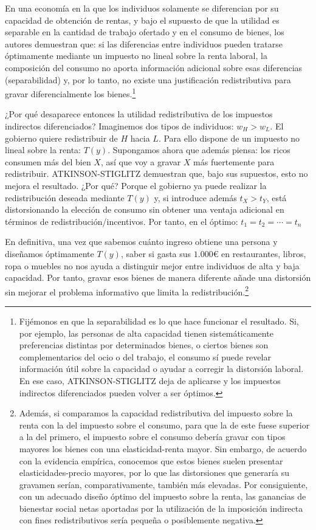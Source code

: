 \documentclass[10pt,a4paper]{article}
\begin{document}
En una economía en la que los individuos solamente se diferencian por su capacidad de obtención de rentas, y bajo el supuesto de que la utilidad es separable en la cantidad de trabajo ofertado y en el consumo de bienes, los autores demuestran que: si las diferencias entre individuos pueden tratarse óptimamente mediante un impuesto no lineal sobre la renta laboral, la composición del consumo no aporta información adicional sobre esas diferencias (separabilidad) y, por lo tanto, no existe una justificación redistributiva para gravar diferencialmente los bienes.\footnote{%
    Fijémonos en que la separabilidad es lo que hace funcionar el resultado. Si, por ejemplo, las personas de alta capacidad tienen sistemáticamente preferencias distintas por determinados bienes, o ciertos bienes son complementarios del ocio o del trabajo, el consumo sí puede revelar información útil sobre la capacidad o ayudar a corregir la distorsión laboral. En ese caso, ATKINSON-STIGLITZ deja de aplicarse y los impuestos indirectos diferenciados pueden volver a ser óptimos.
}

¿Por qué desaparece entonces la utilidad redistributiva de los impuestos indirectos diferenciados? Imaginemos dos tipos de individuos: $w_H>w_L$. El gobierno quiere redistribuir de $H$ hacia $L$. Para ello dispone de un impuesto no lineal sobre la renta: $T(y)$. Supongamos ahora que además piensa: los ricos consumen más del bien $X$, así que voy a gravar $X$ más fuertemente para redistribuir. ATKINSON-STIGLITZ demuestran que, bajo sus supuestos, esto no mejora el resultado. ¿Por qué? Porque el gobierno ya puede realizar la redistribución deseada mediante $T(y)$ y, si introduce además $t_X>t_Y$, está distorsionando la elección de consumo sin obtener una ventaja adicional en términos de redistribución/incentivos. Por tanto, en el óptimo: $t_1=t_2=\cdots=t_n$

En definitiva, una vez que sabemos cuánto ingreso obtiene una persona y diseñamos óptimamente $T(y)$, saber si gasta sus $1.000€$ en restaurantes, libros, ropa o muebles no nos ayuda a distinguir mejor entre individuos de alta y baja capacidad. Por tanto, gravar esos bienes de manera diferente añade una distorsión sin mejorar el problema informativo que limita la redistribución.\footnote{%
    Además, si comparamos la capacidad redistributiva del impuesto sobre la renta con la del impuesto sobre el consumo, para que la de este fuese superior a la del primero, el impuesto sobre el consumo debería gravar con tipos mayores los bienes con una elasticidad-renta mayor. Sin embargo, de acuerdo con la evidencia empírica, conocemos que estos bienes suelen presentar elasticidades-precio mayores, por lo que las distorsiones que generaría su gravamen serían, comparativamente, también más elevadas. Por consiguiente, con un adecuado diseño óptimo del impuesto sobre la renta, las ganancias de bienestar social netas aportadas por la utilización de la imposición indirecta con fines redistributivos sería pequeña o posiblemente negativa.
}
\end{document}
